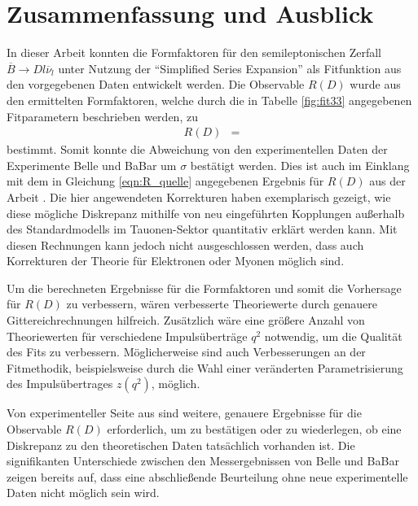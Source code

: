 \chapter{Zusammenfassung und Ausblick}

In dieser Arbeit konnten die Formfaktoren für den semileptonischen Zerfall $\overline{B} \to D l \overline{\nu}_l$ unter Nutzung der \enquote{Simplified Series Expansion} als Fitfunktion aus den vorgegebenen Daten entwickelt werden.
Die Observable $R(D)$ wurde aus den ermittelten Formfaktoren, welche durch die in Tabelle \ref{fig:fit33} angegebenen Fitparametern beschrieben werden, zu
\begin{align*}
  R(D) &= 
\end{align*}
bestimmt.
Somit konnte die Abweichung von den experimentellen Daten der Experimente Belle und BaBar um $\sigma$ bestätigt werden.
Dies ist auch im Einklang mit dem in Gleichung \eqref{eqn:R_quelle} angegebenen Ergebnis für $R(D)$ aus der Arbeit \cite{PhysRevD.92.034506}.
Die hier angewendeten Korrekturen haben exemplarisch gezeigt, wie diese mögliche Diskrepanz mithilfe von neu eingeführten Kopplungen außerhalb des Standardmodells im Tauonen-Sektor quantitativ erklärt werden kann.
Mit diesen Rechnungen kann jedoch nicht ausgeschlossen werden, dass auch Korrekturen der Theorie für Elektronen oder Myonen möglich sind.

Um die berechneten Ergebnisse für die Formfaktoren und somit die Vorhersage für $R(D)$ zu verbessern, wären verbesserte Theoriewerte durch genauere Gittereichrechnungen hilfreich.
Zusätzlich wäre eine größere Anzahl von Theoriewerten für verschiedene Impulsüberträge $q^2$ notwendig, um die Qualität des Fits zu verbessern.
Möglicherweise sind auch Verbesserungen an der Fitmethodik, beispielsweise durch die Wahl einer veränderten Parametrisierung des Impulsübertrages $z(q^2)$, möglich.

Von experimenteller Seite aus sind weitere, genauere Ergebnisse für die Observable $R(D)$ erforderlich, um zu bestätigen oder zu wiederlegen, ob eine Diskrepanz zu den theoretischen Daten tatsächlich vorhanden ist.
Die signifikanten Unterschiede zwischen den Messergebnissen von Belle und BaBar zeigen bereits auf, dass eine abschließende Beurteilung ohne neue experimentelle Daten nicht möglich sein wird.
